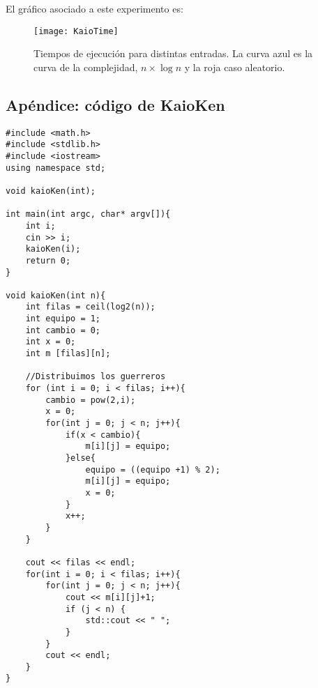 El gráfico asociado a este experimento es:
\begin{figure}[h!]
  \centering
  \texttt{[image: KaioTime]}
  \caption{Tiempos de ejecución para distintas entradas. La curva azul es la curva de la complejidad, $n \times \log n$ y la roja caso aleatorio.}
\end{figure}







\newpage

\subsection{Apéndice: código de KaioKen}
\begin{lstlisting}
#include <math.h>
#include <stdlib.h>
#include <iostream>
using namespace std;

void kaioKen(int);

int main(int argc, char* argv[]){
	int i;
	cin >> i;
	kaioKen(i);
	return 0;
}

void kaioKen(int n){
	int filas = ceil(log2(n));
	int equipo = 1;
	int cambio = 0;
	int x = 0;
	int m [filas][n];

	//Distribuimos los guerreros
	for (int i = 0; i < filas; i++){
		cambio = pow(2,i);
		x = 0;
		for(int j = 0; j < n; j++){
			if(x < cambio){
				m[i][j] = equipo;
			}else{
				equipo = ((equipo +1) % 2);
				m[i][j] = equipo;
				x = 0;
			}
			x++;
		}
	}

	cout << filas << endl;
	for(int i = 0; i < filas; i++){
		for(int j = 0; j < n; j++){
			cout << m[i][j]+1;
			if (j < n) {
				std::cout << " ";
			}
		}
		cout << endl;
	}
}
\end{lstlisting}
